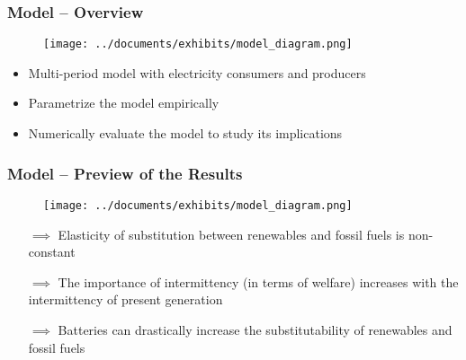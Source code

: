 \documentclass[aspectratio=169]{beamer}
\begin{document}
\begin{frame}
\frametitle{Model -- Overview}


\begin{figure}
	\texttt{[image: ../documents/exhibits/model\_diagram.png]} 
\end{figure}

\vspace{-1em}

\begin{itemize}
	\setlength\itemsep{0.2em}
	\item Multi-period model with electricity consumers and producers
	\item Parametrize the model empirically
	\item Numerically evaluate the model to study its implications
\end{itemize}

\end{frame}



\begin{frame}
\frametitle{Model -- Preview of the Results}


\begin{figure}
	\texttt{[image: ../documents/exhibits/model\_diagram.png]} 
\end{figure}

\vspace{-0.8em}

\begin{itemize}
	\setlength\itemsep{0.2em}
	\item[$\implies$] Elasticity of substitution between renewables and fossil fuels is non-constant
	\item[$\implies$] The importance of intermittency (in terms of welfare) increases with the intermittency of present generation
	\item[$\implies$] Batteries can drastically increase the substitutability of renewables and fossil fuels
\end{itemize}

\end{frame}
\end{document}
